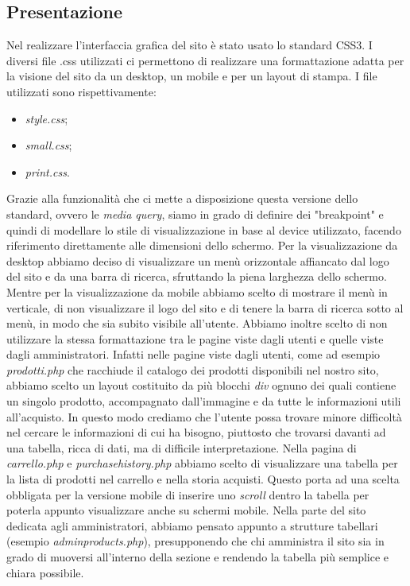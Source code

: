 \subsection{Presentazione}

Nel realizzare l'interfaccia grafica del sito è stato usato lo standard CSS3.\newline
I diversi file .css utilizzati ci permettono di realizzare una formattazione adatta per la visione del sito da un desktop, un mobile e per un layout di stampa.\newline
I file utilizzati sono rispettivamente:
\begin{itemize}
\item\textit{style.css};
\item\textit{small.css};
\item\textit{print.css}.
\end{itemize}
Grazie alla funzionalità che ci mette a disposizione questa versione dello standard, ovvero le \textit{media query}, siamo in grado di definire dei "breakpoint" e quindi di modellare lo stile di visualizzazione in base al device utilizzato, facendo riferimento direttamente alle dimensioni dello schermo.\newline
Per la visualizzazione da desktop abbiamo deciso di visualizzare un menù orizzontale affiancato dal logo del sito e da una barra di ricerca, sfruttando la piena larghezza dello schermo.\newline 
Mentre per la visualizzazione da mobile abbiamo scelto di mostrare il menù in verticale, di non visualizzare il logo del sito e di tenere la barra di ricerca sotto al menù, in modo che sia subito visibile all'utente.\newline
\newline
Abbiamo inoltre scelto di non utilizzare la stessa formattazione tra le pagine viste dagli utenti e quelle viste dagli amministratori. Infatti nelle pagine viste dagli utenti, come ad esempio \textit{prodotti.php} che racchiude il catalogo dei prodotti disponibili nel nostro sito, abbiamo scelto un layout costituito da più blocchi \textit{div} ognuno dei quali contiene un singolo prodotto, accompagnato dall'immagine e da tutte le informazioni utili all'acquisto.\newline
In questo modo crediamo che l'utente possa trovare minore difficoltà nel cercare le informazioni di cui ha bisogno, piuttosto che trovarsi davanti ad una tabella, ricca di dati, ma di difficile interpretazione.\newline
Nella pagina di \textit{carrello.php} e \textit{purchasehistory.php} abbiamo scelto di visualizzare una tabella per la lista di prodotti nel carrello e nella storia acquisti.\newline
Questo porta ad una scelta obbligata per la versione mobile di inserire uno \textit{scroll} dentro la tabella per poterla appunto visualizzare anche su schermi mobile.\newline 
Nella parte del sito dedicata agli amministratori, abbiamo pensato appunto a strutture tabellari (esempio \textit{adminproducts.php}), presupponendo che chi amministra il sito sia in grado di muoversi all'interno della sezione e rendendo la tabella più semplice e chiara possibile.